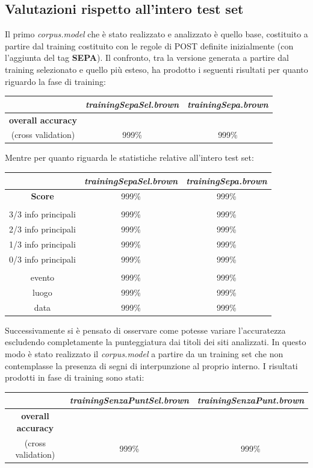 \documentclass[a4paper]{report}
\begin{document}
\subsection{Valutazioni rispetto all'intero test set}
Il primo \textit{corpus.model} che è stato realizzato e analizzato è quello base, costituito a partire dal training costituito con le regole di POST definite inizialmente (con l'aggiunta del tag \textbf{SEPA}). Il confronto, tra la versione generata a partire dal training selezionato e quello più esteso, ha prodotto i seguenti risultati per quanto riguardo la fase di training:
\begin{center}
\begin{tabular}{c c c}
\hline
 & \textit{trainingSepaSel.brown} & \textit{trainingSepa.brown}\\
\hline
\textbf{overall accuracy} \\ (cross validation) & 999\% & 999\% \\
\hline
\end{tabular}
\end{center}
Mentre per quanto riguarda le statistiche relative all'intero test set:
\begin{center}
\begin{tabular}{|ccc|}
\hline
 & \textit{trainingSepaSel.brown} & \textit{trainingSepa.brown}\\
\hline
\textbf{Score} & 999\% & 999\% \\
\hline
 & &  \\
\hline
3/3 info principali & 999\% & 999\% \\
2/3 info principali & 999\% & 999\% \\
1/3 info principali & 999\% & 999\% \\
0/3 info principali & 999\% & 999\% \\
\hline
 & &  \\
\hline
evento & 999\% & 999\% \\
luogo & 999\% & 999\% \\
data & 999\% & 999\% \\
\hline
\end{tabular}
\end{center}
Successivamente si è pensato di osservare come potesse variare l'accuratezza escludendo completamente la punteggiatura dai titoli dei siti analizzati. In questo modo è stato realizzato il \textit{corpus.model} a partire da un training set che non contemplasse la presenza di segni di interpunzione al proprio interno. I risultati prodotti in fase di training sono stati:
\begin{center}
\begin{tabular}{c c c}
\hline
 & \textit{trainingSenzaPuntSel.brown} & \textit{trainingSenzaPunt.brown}\\
\hline
\textbf{overall accuracy} \\ (cross validation) & 999\% & 999\% \\
\hline
\end{tabular}
\end{center}
\end{document}
